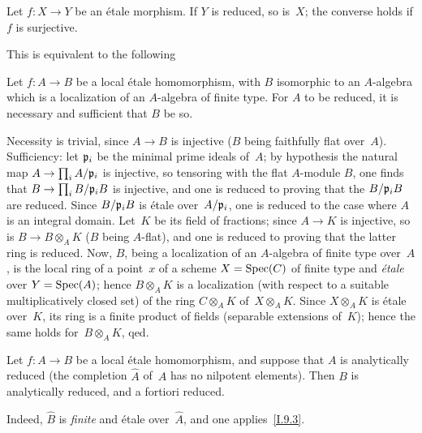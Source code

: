 \setcounter{theorem}{1}
\begingroup
\renewcommand{\theHtheorem}{\theHsection.\arabic{theorem}.bis}
\begin{proposition}
\label{prop:I.9.2}
Let $f\colon X\to Y$ be an \'etale morphism. If $Y$ is
reduced, so is~$X$; the converse holds if $f$ is surjective.
\end{proposition}
\endgroup

This is equivalent to the following

\begin{corollary}
\label{I.9.3}
Let $f\colon A\to B$ be a local \'etale homomorphism, with
$B$ isomorphic to an
$A$-algebra which is a localization of an $A$-algebra of
finite type. For $A$ to be reduced, it is necessary and
sufficient that $B$ be so.
\end{corollary}

Necessity is trivial, since $A\to B$ is injective ($B$ being
faithfully flat over~$A$). Sufficiency: let $\mathfrak{p}_i$ be
the minimal prime ideals of~$A$; by hypothesis the natural
map $A\to\prod_i A/\goth{p}_i$ is injective, so tensoring
with the flat $A$-module $B$, one finds that
$B\to\prod_i B/\goth{p}_iB$ is injective, and one is reduced
to proving that the $B/\mathfrak{p}_iB$ are reduced. Since
$B/\mathfrak{p}_iB$ is \'etale over~$A/\mathfrak{p}_i$, one is
reduced to the case where $A$ is an integral domain. Let~$K$
be its field of fractions; since $A\to K$ is injective,
so is $B\to B\otimes_A K$ ($B$ being $A$-flat), and one is
reduced to proving that the latter ring is reduced. Now,
$B$, being a localization of an $A$-algebra of finite type
over~$A$, is the local ring of a point~$x$ of a scheme
$X=\operatorname{Spec}(C)$ of finite type and \emph{\'etale} over
$Y=\operatorname{Spec}(A)$; hence $B\otimes_A K$ is a localization (with
respect to a suitable multiplicatively closed set) of the
ring $C\otimes_A K$ of~$X\otimes_A K$. Since $X\otimes_A K$
is \'etale over~$K$, its ring is a finite product of fields
(separable extensions of~$K$); hence the same holds
for~$B\otimes_A K$, qed.

\begin{corollary}
\label{I.9.4}
Let $f\colon A\to B$ be a local \'etale homomorphism, and
suppose that $A$ is analytically reduced (\ie the completion
$\hat{A}$ of~$A$ has no nilpotent elements). Then $B$ is
analytically reduced, and a fortiori reduced.
\end{corollary}

Indeed, $\hat{B}$ is \emph{finite} and \'etale over~$\hat{A}$,
and one applies~\ref{I.9.3}.

